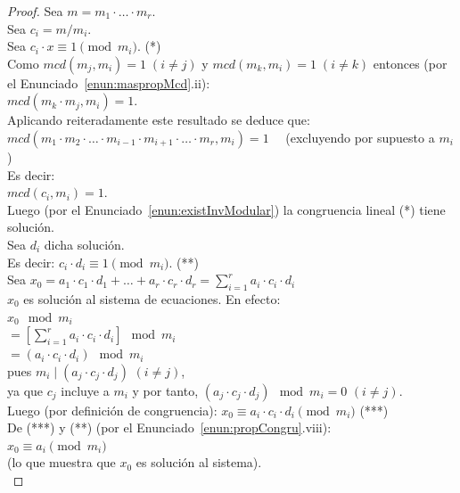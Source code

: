 \begin{proof}
Sea $m=m_{1} \cdot \ldots \cdot m_{r}$. \\
Sea $c_{i}=m / m_{i}$. \\
Sea $c_{i} \cdot x \equiv 1\pmod {m_{i}}$. \quad\quad\quad\quad\quad\quad\quad\quad\quad\quad\quad\quad\quad\quad\quad\quad\quad (*)\\
Como $mcd(m_{j}, m_{i})=1 \; (i \neq j)$ y $mcd(m_{k}, m_{i})=1 \; (i \neq k)$ entonces (por el Enunciado~\ref{enun:maspropMcd}.ii): \\
$mcd(m_{k} \cdot m_{j}, m_{i})=1$. \\
Aplicando reiteradamente este resultado se deduce que: \\
$mcd(m_{1} \cdot m_{2} \cdot \ldots \cdot m_{i-1} \cdot m_{i+1} \cdot \ldots \cdot m_{r}, m_{i})=1 \quad$ (excluyendo por supuesto a $m_{i}$ )\\
Es decir: \\
$mcd(c_{i}, m_{i})=1$.\\
Luego (por el Enunciado~\ref{enun:existInvModular}) la congruencia lineal (*) tiene solución. \\
Sea $d_{i}$ dicha solución. \\
Es decir: $c_{i} \cdot d_{i} \equiv 1\pmod {m_{i}}$. \quad\quad\quad\quad\quad\quad\quad\quad\quad\quad\quad\quad\quad\quad (**)\\
Sea $x_{0}=a_{1} \cdot c_{1} \cdot d_{1}+ \ldots +a_{r} \cdot c_{r} \cdot d_{r}=\sum_{i=1}^{r} a_i \cdot c_i \cdot d_i$\\
$x_0$ es solución al sistema de ecuaciones. En efecto:\\
$x_{0} \mod m_{i}$ \\
$=[\sum_{i=1}^{r} a_{i} \cdot c_{i} \cdot d_{i}] \mod m_{i}$ \\
$=(a_{i} \cdot c_{i} \cdot d_{i}) \mod m_{i}$ \\
pues $m_{i} \mid(a_{j} \cdot c_{j} \cdot d_{j})$ \quad $(i \neq j)$, \\ ya que $c_{j}$ incluye a $m_{i}$ y por tanto, $(a_{j} \cdot c_{j} \cdot d_{j}) \mod m_{i}=0$ \quad $(i \neq j)$. \\
Luego (por definición de congruencia): $x_{0} \equiv a_{i} \cdot c_{i} \cdot d_{i} \pmod {m_{i}}$ \quad(***)\\
De (***) y (**) (por el Enunciado~\ref{enun:propCongru}.viii):\\
$x_{0} \equiv a_{i}\pmod {m_{i}}$\\
(lo que muestra que $x_{0}$ es solución al sistema).\\

\end{proof}
